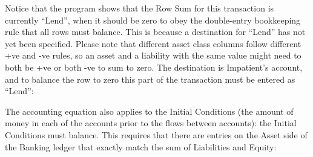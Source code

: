 Notice that the program shows that the Row Sum for this transaction is
currently ``Lend'', when it should be zero to obey the double-entry
bookkeeping rule that all rows must balance. This is because a
destination for ``Lend'' has not yet been specified. Please note that different
asset class columns follow different +ve and -ve rules, so an asset and a liability
with the same value might need to both be +ve or both -ve to sum to zero. The destination
is Impatient's account, and to balance the row to zero this part of
the transaction must be entered as ``Lend'': 

\begin{center}
\end{center}

The accounting equation also applies to the Initial Conditions (the amount of money
in each of the accounts prior to the flows between accounts): the
Initial Conditions must balance. This requires that there are
entries on the Asset side of the Banking ledger that exactly match the
sum of Liabilities and Equity: 

